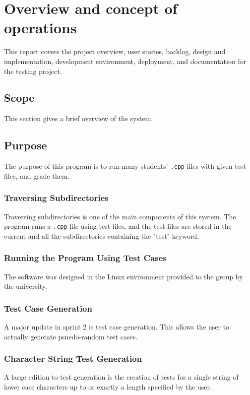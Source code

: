 
\chapter{Overview and concept of operations}

This report covers the project overview, user stories, backlog, design and implementation, development environment, deployment, and documentation for the testing project. 


\section{Scope}
This section gives a brief overview of the system.


\section{Purpose}
The purpose of this program is to run many students' {\tt .cpp} files with given test files, and grade them. 


\subsection{Traversing Subdirectories}
Traversing subdirectories is one of the main components of this system. The program runs a {\tt .cpp} file using test files, and the test files are stored in the current and all the subdirectories containing the "test" keyword.

\subsection{Running the Program Using Test Cases}
The software was designed in the Linux environment provided to the group by the university. 

\subsection{Test Case Generation}
A major update in sprint 2 is test case generation. This allows the user to actually generate psuedo-random test cases.

\subsection{Character String Test Generation}
A large edition to test generation is the creation of tests for a single string of lower case characters up to or exactly a length specified by the user.

